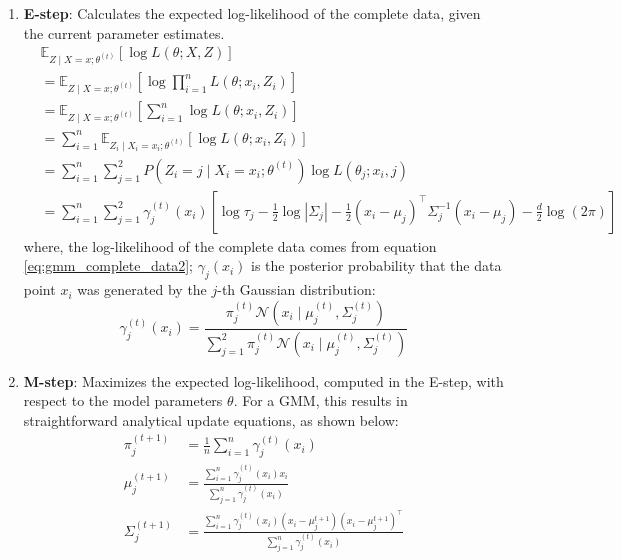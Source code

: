 \begin{enumerate}
    \item \textbf{E-step}: Calculates the expected log-likelihood of the complete data, given the current parameter estimates.
    \begin{align}
    &\mathbb{E}_{Z \mid X = x; \theta^{(t)}} \left[ \log L(\theta; X, Z) \right] \nonumber \\
    &= \mathbb{E}_{Z \mid X = x; \theta^{(t)}} \left[ \log \prod_{i=1}^n L(\theta; x_i, Z_i) \right] \nonumber \\
    &= \mathbb{E}_{Z \mid X = x; \theta^{(t)}} \left[ \sum_{i=1}^n \log L(\theta; x_i, Z_i) \right] \nonumber \\
    &= \sum_{i=1}^n \mathbb{E}_{Z_i \mid X_i = x_i; \theta^{(t)}} \left[ \log L(\theta; x_i, Z_i) \right] \nonumber \\
    &= \sum_{i=1}^n \sum_{j=1}^2 P(Z_i = j \mid X_i = x_i; \theta^{(t)}) \log L(\theta_j; x_i, j) \nonumber \\
    &= \sum_{i=1}^n \sum_{j=1}^2 \gamma_{j}^{(t)}(x_i) \left[ \log \tau_j - \frac{1}{2} \log |\Sigma_j| - \frac{1}{2} (x_i - \mu_j)^\top \Sigma_j^{-1} (x_i - \mu_j) - \frac{d}{2} \log(2\pi) \right]
    \end{align}
    where, the log-likelihood of the complete data comes from equation \ref{eq:gmm_complete_data2}; $\gamma_{j}(x_i)$ is the posterior probability that the data point $x_i$ was generated by the $j$-th Gaussian distribution:
    \begin{equation}
        \gamma_{j}^{(t)}(x_i) = \frac{\pi_j^{(t)} \mathcal{N}(x_i \mid \mu_j^{(t)}, \Sigma_j^{(t)})}{\sum_{j=1}^{2} \pi_j^{(t)} \mathcal{N}(x_i \mid \mu_j^{(t)}, \Sigma_j^{(t)})}
    \end{equation}
    \item \textbf{M-step}: Maximizes the expected log-likelihood, computed in the E-step, with respect to the model parameters $\theta$. For a GMM, this results in straightforward analytical update equations, as shown below:
    \begin{align}
        \pi_j^{(t+1)} &= \frac{1}{n} \sum_{i=1}^{n} \gamma_{j}^{(t)}(x_i)  \nonumber \\
        \mu_j^{(t+1)} &= \frac{\sum_{i=1}^{n} \gamma_{j}^{(t)}(x_i) x_i}{\sum_{j=1}^{n} \gamma_{j}^{(t)}(x_i)} \nonumber \\
        \Sigma_j^{(t+1)} &= \frac{\sum_{i=1}^{n} \gamma_{j}^{(t)}(x_i) (x_i - \mu_j^{t+1})(x_i - \mu_j^{t+1})^\top}{\sum_{j=1}^{n} \gamma_{j}^{(t)}(x_i)}
    \end{align}
\end{enumerate}

